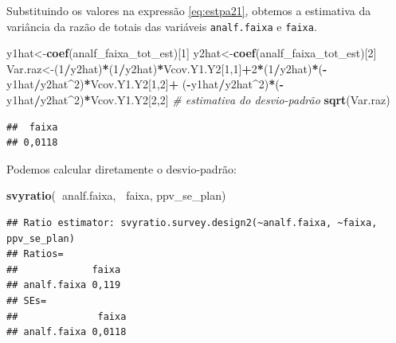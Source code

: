 \documentclass[]{book}
\newenvironment{Shaded}{\begin{snugshade}}{\end{snugshade}}
\newcommand{\KeywordTok}[1]{\textcolor[rgb]{0.13,0.29,0.53}{\textbf{#1}}}
\newcommand{\DecValTok}[1]{\textcolor[rgb]{0.00,0.00,0.81}{#1}}
\newcommand{\CommentTok}[1]{\textcolor[rgb]{0.56,0.35,0.01}{\textit{#1}}}
\newcommand{\OperatorTok}[1]{\textcolor[rgb]{0.81,0.36,0.00}{\textbf{#1}}}
\newcommand{\NormalTok}[1]{#1}
\theoremstyle{definition}
\theoremstyle{definition}
\theoremstyle{definition}
\theoremstyle{remark}
\begin{document}
Substituindo os valores na expressão \eqref{eq:estpa21}, obtemos a
estimativa da variância da razão de totais das variáveis
\texttt{analf.faixa} e \texttt{faixa}.

\begin{Shaded}
\begin{Highlighting}[]
\NormalTok{y1hat<-}\KeywordTok{coef}\NormalTok{(analf_faixa_tot_est)[}\DecValTok{1}\NormalTok{]}
\NormalTok{y2hat<-}\KeywordTok{coef}\NormalTok{(analf_faixa_tot_est)[}\DecValTok{2}\NormalTok{]}
\NormalTok{Var.raz<-(}\DecValTok{1}\OperatorTok{/}\NormalTok{y2hat)}\OperatorTok{*}\NormalTok{(}\DecValTok{1}\OperatorTok{/}\NormalTok{y2hat)}\OperatorTok{*}\NormalTok{Vcov.Y1.Y2[}\DecValTok{1}\NormalTok{,}\DecValTok{1}\NormalTok{]}\OperatorTok{+}\DecValTok{2}\OperatorTok{*}\NormalTok{(}\DecValTok{1}\OperatorTok{/}\NormalTok{y2hat)}\OperatorTok{*}\NormalTok{(}\OperatorTok{-}\NormalTok{y1hat}\OperatorTok{/}\NormalTok{y2hat}\OperatorTok{^}\DecValTok{2}\NormalTok{)}\OperatorTok{*}\NormalTok{Vcov.Y1.Y2[}\DecValTok{1}\NormalTok{,}\DecValTok{2}\NormalTok{]}\OperatorTok{+}
\NormalTok{(}\OperatorTok{-}\NormalTok{y1hat}\OperatorTok{/}\NormalTok{y2hat}\OperatorTok{^}\DecValTok{2}\NormalTok{)}\OperatorTok{*}\NormalTok{(}\OperatorTok{-}\NormalTok{y1hat}\OperatorTok{/}\NormalTok{y2hat}\OperatorTok{^}\DecValTok{2}\NormalTok{)}\OperatorTok{*}\NormalTok{Vcov.Y1.Y2[}\DecValTok{2}\NormalTok{,}\DecValTok{2}\NormalTok{]}
\CommentTok{# estimativa do desvio-padrão}
\KeywordTok{sqrt}\NormalTok{(Var.raz)}
\end{Highlighting}
\end{Shaded}

\begin{verbatim}
##  faixa 
## 0,0118
\end{verbatim}

Podemos calcular diretamente o desvio-padrão:

\begin{Shaded}
\begin{Highlighting}[]
\KeywordTok{svyratio}\NormalTok{(}\OperatorTok{~}\NormalTok{analf.faixa, }\OperatorTok{~}\NormalTok{faixa, ppv_se_plan)}
\end{Highlighting}
\end{Shaded}

\begin{verbatim}
## Ratio estimator: svyratio.survey.design2(~analf.faixa, ~faixa, ppv_se_plan)
## Ratios=
##             faixa
## analf.faixa 0,119
## SEs=
##              faixa
## analf.faixa 0,0118
\end{verbatim}
\end{document}
